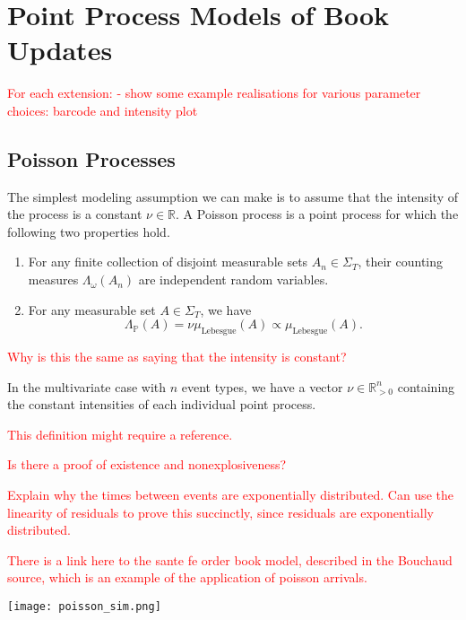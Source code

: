 \documentclass[honours,12pt]{unswthesis}
\numberwithin{equation}{section}
\begin{document}


\section{Point Process Models of Book Updates}

\textcolor{red}{
For each extension:
- show some example realisations for various parameter choices: barcode and intensity plot
}


\subsection{Poisson Processes}
The simplest modeling assumption we can make is to assume that the intensity of the process is a constant $\nu\in\mathbb{R}$. A Poisson process is a point process for which the following two properties hold.
\begin{enumerate}
	\item For any finite collection of disjoint measurable sets $A_n\in\Sigma_T$, their counting measures $\Lambda_\omega(A_n)$ are independent random variables.
	\item For any measurable set $A\in\Sigma_T$, we have $$\Lambda_{\mathbb P}(A) = \nu \mu_{\mathrm{Lebesgue}}(A)\propto\mu_{\mathrm{Lebesgue}}(A).$$
\end{enumerate}
\textcolor{red}{Why is this the same as saying that the intensity is constant?}

In the multivariate case with $n$ event types, we have a vector $\nu\in\mathbb{R}_{>0}^n$ containing the constant intensities of each individual point process.

\textcolor{red}{This definition might require a reference.}

\textcolor{red}{Is there a proof of existence and nonexplosiveness?}

\textcolor{red}{Explain why the times between events are exponentially distributed. Can use the linearity of residuals to prove this succinctly, since residuals are exponentially distributed.}

\textcolor{red}{There is a link here to the sante fe order book model, described in the Bouchaud source, which is an example of the application of poisson arrivals.}

\texttt{[image: poisson\_sim.png]}
\end{document}
